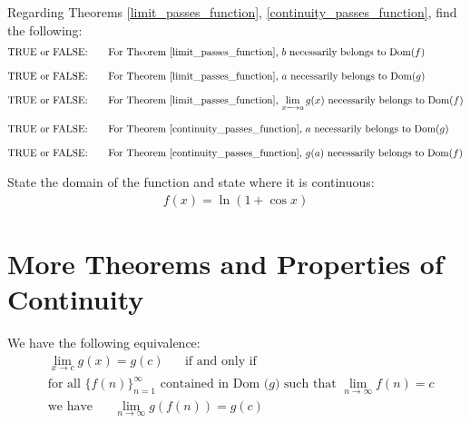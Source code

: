 \begin{exercise}
Regarding Theorems \ref{limit_passes_function}, \ref{continuity_passes_function}, find the following:
\begin{align*}
    &\text{TRUE or FALSE:} \hspace{20pt} \text{For Theorem \ref{limit_passes_function}, $b$ necessarily belongs to Dom($f$)}\\[2ex]
    &\text{TRUE or FALSE:} \hspace{20pt} \text{For Theorem \ref{limit_passes_function}, $a$ necessarily belongs to Dom($g$)}\\[2ex]
    &\text{TRUE or FALSE:} \hspace{20pt} \text{For Theorem \ref{limit_passes_function}, $\lim_{x \longrightarrow a} g(x)$ necessarily belongs to Dom($f$)}\\[2ex]
    &\text{TRUE or FALSE:} \hspace{20pt} \text{For Theorem \ref{continuity_passes_function}, $a$ necessarily belongs to Dom($g$)}\\[2ex]
    &\text{TRUE or FALSE:} \hspace{20pt} \text{For Theorem \ref{continuity_passes_function}, $g(a)$ necessarily belongs to Dom($f$)}
\end{align*}
\end{exercise}

\begin{exercise}
State the domain of the function and state where it is continuous:
\begin{align*}
    f(x) = \ln (1 + \cos x)
\end{align*}
\end{exercise}

\newpage
\section{More Theorems and Properties of Continuity}

\begin{theorem}
We have the following equivalence:
\begin{align*}
    &\lim_{x \longrightarrow c} g(x) = g(c) \hspace{20pt} \text{if and only if}\\[2ex]
    &\text{for all} \hspace{4pt} \{f(n)\}_{n=1}^{\infty} \hspace{4pt} \text{contained in Dom ($g$) such that} \hspace{4pt} \lim_{n \longrightarrow \infty} f(n)=c\\[2ex]
    &\text{we have} \hspace{20pt} \lim_{n \longrightarrow \infty} g(f(n)) = g(c)
\end{align*}
\label{sequential_criterion_for_continuity}
\end{theorem}

